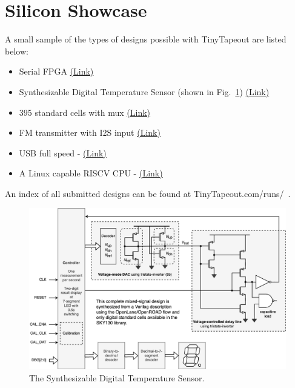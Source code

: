 \section{Silicon Showcase}
\label{sec:silicon_showcase}

A small sample of the types of designs possible with TinyTapeout are listed below:

\begin{itemize}
    \item Serial FPGA \href{https://tinytapeout.com/runs/tt02/006/}{(Link)}
    \item Synthesizable Digital Temperature Sensor (shown in Fig.~\ref{fig:synthesizable_digital_temperature_sensor}) \href{https://tinytapeout.com/runs/tt03/047/}{(Link)}
    \item 395 standard cells with mux \href{https://tinytapeout.com/runs/tt03/045/}{(Link)}
    \item FM transmitter with I2S input \href{https://tinytapeout.com/runs/tt04/195/}{(Link)}
    \item USB full speed - \href{https://tinytapeout.com/runs/tt04/054/}{(Link)}
    \item A Linux capable RISCV CPU - \href{https://tinytapeout.com/runs/tt05/654/}{(Link)}
\end{itemize}

An index of all submitted designs can be found at TinyTapeout.com/runs/~\cite{tinytapeoutruns}.

\begin{figure}[htp]
\centering
\includegraphics[width=\columnwidth]{./Figs/synthesized_temperature_sensor.png}
\caption{The Synthesizable Digital Temperature Sensor.}
\label{fig:synthesizable_digital_temperature_sensor}
\end{figure}
